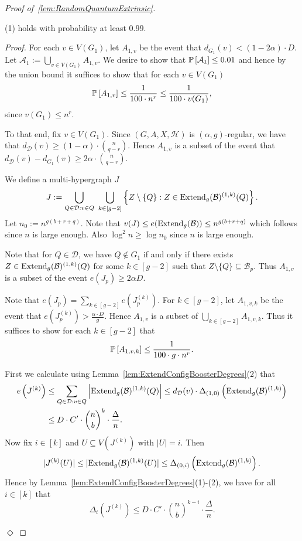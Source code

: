 \documentclass[11pt]{article}
\newcommand{\mc}[1]{\mathcal{#1}}
\newcounter{i}
\theoremstyle{plain}
\newenvironment{proofclaim}[1][]%
{\noindent \emph{Proof.} {}{#1}{}}{\hfill
	$\Diamond$\vspace{1em}}
\renewcommand{\theclaim}{\thetheorem.\arabic{claim}}
\newenvironment{lateproof}[1]
 {%
  \renewcommand{\theclaim}{\ref{#1}.\arabic{claim}}%
  \begin{proof}[Proof of~\cref{#1}]%
 }
 {\end{proof}}
\theoremstyle{plain} %
\theoremstyle{definition}
\newcommand{\Prob}[1]{\ensuremath{%
\mathbb P\left[#1\right]
}}
\begin{document}
\begin{lateproof}{lem:RandomQuantumExtrinsic}
\begin{claim}\label{cl:5Holds}
(1) holds with probability at least $0.99$.    
\end{claim}
\begin{proofclaim}
For each $v\in V(G_1)$, let $A_{1,v}$ be the event that $d_{G_1}(v) < (1-2\alpha)\cdot D$.
Let $\mathcal{A}_1 := \bigcup_{v\in V(G_1)} A_{1,v}$. We desire to show that $\Prob{\mc{A}_1} \le 0.01$ and hence by the union bound it suffices to show that for each $v\in V(G_1)$
$$\Prob{A_{1,v}} \le \frac{1}{100\cdot n^r} \le \frac{1}{100 \cdot v(G_1)},$$
since $v(G_1)\le n^r$.

To that end, fix $v\in V(G_1)$. Since $(G,A,X,\mc{H})$ is $(\alpha,g)$-regular, we have that  $d_{\mc{D}}(v) \ge (1-\alpha)\cdot \binom{n}{q-r}$. Hence $A_{1,v}$ is a subset of the event that $d_{\mc{D}}(v) - d_{G_1}(v) \ge 2\alpha\cdot \binom{n}{q-r}$. 

We define a multi-hypergraph $J$ 
$$J:= \bigcup_{Q\in \mc{D}: v\in Q}~\bigcup_{k\in [g-2]} \left\{ Z\setminus \{Q\}: Z\in{\rm Extend}_g(\mc{B})^{(1,k)}(Q)\right\}.$$
Let $n_0:= n^{g(b+r+q)}$. Note that $v(J) \le e({\rm Extend}_g(\mc{B})) \le n^{g(b+r+q)}$ which follows since $n$ is large enough. Also $\log^2 n\ge \log n_0$ since $n$ is large enough.

Note that for $Q\in \mc{D}$, we have $Q\not\in G_1$ if and only if there exists $Z\in{\rm Extend}_g(\mc{B})^{(1,k)}(Q)$ for some $k\in [g-2]$ such that $Z\setminus \{Q\}\subseteq \mc{B}_p$. Thus $A_{1,v}$ is a subset of the event $e(J_p) \ge 2\alpha D$.

Note that $e(J_p) = \sum_{k\in [g-2]} e\left(J^{(k)}_p\right)$. For $k\in [g-2]$, let $A_{1,v,k}$ be the event that $e\left(J^{(k)}_p\right) > \frac{\alpha\cdot D}{g}$. Hence $A_{1,v}$ is a subset of $\bigcup_{k \in [g-2]} A_{1,v,k}$. Thus it suffices to show for each  $k\in [g-2]$ that
$$\Prob{A_{1,v,k}} \le \frac{1}{100\cdot g \cdot n^r}.$$

First we calculate using Lemma~\ref{lem:ExtendConfigBoosterDegrees}(2) that
\begin{align*}
e\left(J^{(k)}\right) &\le \sum_{Q\in \mc{D}: v\in Q} \left|{\rm Extend}_g(\mc{B})^{(1,k)}(Q)\right|\le d_{\mc{D}}(v) \cdot \Delta_{(1,0)}\left({\rm Extend}_g(\mc{B})^{(1,k)}\right) \\
&\le D\cdot C'\cdot \binom{n}{b}^k\cdot \frac{\Delta}{n}.
\end{align*}
Now fix $i\in [k]$ and $U\subseteq V(J^{(k)})$ with $|U|=i$. Then
$$|J^{(k)}(U)| \le |{\rm Extend}_g(\mc{B})^{(1,k)}(U)| \le 
\Delta_{(0,i)}\left({\rm Extend}_g(\mc{B})^{(1,k)}\right).$$
Hence by Lemma~\ref{lem:ExtendConfigBoosterDegrees}(1)-(2), we have for all $i\in [k]$ that 
$$\Delta_i\left(J^{(k)}\right) \le D\cdot C'\cdot \binom{n}{b}^{k-i}\cdot \frac{\Delta}{n}.$$


\end{proofclaim}
\end{lateproof}
\end{document}

